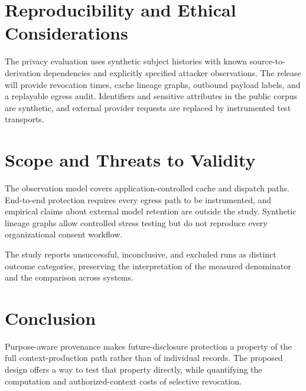 \documentclass[11pt,a4paper]{article}
\begin{document}
\section{Reproducibility and Ethical Considerations}
The privacy evaluation uses synthetic subject histories with known source-to-derivation dependencies and explicitly specified attacker observations. The release will provide revocation times, cache lineage graphs, outbound payload labels, and a replayable egress audit. Identifiers and sensitive attributes in the public corpus are synthetic, and external provider requests are replaced by instrumented test transports.

\section{Scope and Threats to Validity}
The observation model covers application-controlled cache and dispatch paths. End-to-end protection requires every egress path to be instrumented, and empirical claims about external model retention are outside the study. Synthetic lineage graphs allow controlled stress testing but do not reproduce every organizational consent workflow.

The study reports unsuccessful, inconclusive, and excluded runs as distinct outcome categories, preserving the interpretation of the measured denominator and the comparison across systems.

\section{Conclusion}
Purpose-aware provenance makes future-disclosure protection a property of the full context-production path rather than of individual records. The proposed design offers a way to test that property directly, while quantifying the computation and authorized-context costs of selective revocation.



\end{document}
